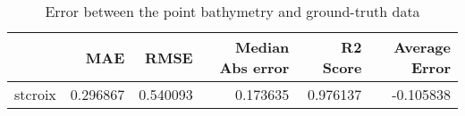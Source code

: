 \begin{table}[h!]
\centering
\caption{Error between the point bathymetry and ground-truth data}
\label{tab:stcroix_lidar_error}
\begin{tabular}{lrrrrr}
\toprule
 & MAE & RMSE & Median Abs error & R2 Score & Average Error \\
\midrule
stcroix & 0.296867 & 0.540093 & 0.173635 & 0.976137 & -0.105838 \\
\bottomrule
\end{tabular}
\end{table}
